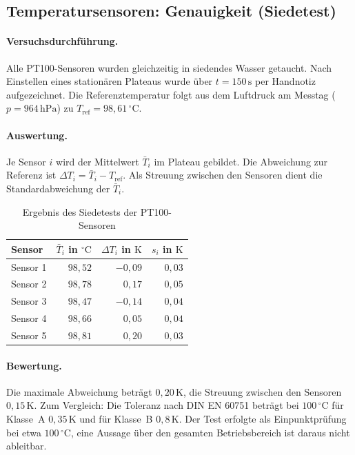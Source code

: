 \subsection{Temperatursensoren: Genauigkeit (Siedetest)}
\label{subsec:val_siedetest}

\paragraph{Versuchsdurchführung.} Alle PT100-Sensoren wurden
gleichzeitig in siedendes Wasser getaucht. Nach Einstellen eines stationären
Plateaus wurde über $t = 150\,\mathrm{s}$ per Handnotiz aufgezeichnet. Die Referenztemperatur folgt aus dem
Luftdruck am Messtag ($p = 964\,\mathrm{hPa}$) zu
$T_\mathrm{ref} = 98{,}61\,^\circ\mathrm{C}$.

\paragraph{Auswertung.} Je Sensor $i$ wird der Mittelwert
$\bar{T}_i$ im Plateau gebildet. Die Abweichung zur Referenz ist
$\Delta T_i = \bar{T}_i - T_\mathrm{ref}$. Als Streuung zwischen den
Sensoren dient die Standardabweichung der $\bar{T}_i$.

\begin{table}[htbp]
    \centering
    \caption{Ergebnis des Siedetests der PT100-Sensoren}
    \label{tab:pt100_siedetest}
    \begin{tabular}{lrrr}
        \hline
        Sensor & $\bar{T}_i$ in $^\circ\mathrm{C}$ & $\Delta T_i$ in $\mathrm{K}$ & $s_i$ in $\mathrm{K}$ \\
        \hline
        Sensor 1 & $98{,}52$ & $-0{,}09$ & $0{,}03$ \\
        Sensor 2 & $98{,}78$ & $0{,}17$  & $0{,}05$ \\
        Sensor 3 & $98{,}47$ & $-0{,}14$ & $0{,}04$ \\
        Sensor 4 & $98{,}66$ & $0{,}05$  & $0{,}04$ \\
        Sensor 5 & $98{,}81$ & $0{,}20$  & $0{,}03$ \\
        \hline
    \end{tabular}
\end{table}

\paragraph{Bewertung.} Die maximale Abweichung beträgt
$0{,}20\,\mathrm{K}$, die Streuung zwischen den Sensoren
$0{,}15\,\mathrm{K}$. Zum Vergleich: Die Toleranz nach DIN EN 60751 beträgt
bei $100\,^\circ\mathrm{C}$ für Klasse~A $0{,}35\,\mathrm{K}$ und für
Klasse~B $0{,}8\,\mathrm{K}$. Der Test erfolgte als Einpunktprüfung bei etwa
$100\,^\circ\mathrm{C}$, eine Aussage über den gesamten Betriebsbereich ist
daraus nicht ableitbar.

